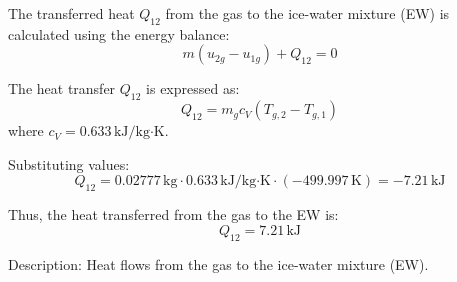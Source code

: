 The transferred heat \( Q_{12} \) from the gas to the ice-water mixture (EW) is calculated using the energy balance:  
\[
m \left( u_{2g} - u_{1g} \right) + Q_{12} = 0
\]  

The heat transfer \( Q_{12} \) is expressed as:  
\[
Q_{12} = m_g c_V \left( T_{g,2} - T_{g,1} \right)
\]  
where \( c_V = 0.633 \, \text{kJ/kg·K} \).  

Substituting values:  
\[
Q_{12} = 0.02777 \, \text{kg} \cdot 0.633 \, \text{kJ/kg·K} \cdot \left( -499.997 \, \text{K} \right) = -7.21 \, \text{kJ}
\]  

Thus, the heat transferred from the gas to the EW is:  
\[
Q_{12} = 7.21 \, \text{kJ}
\]  

Description: Heat flows from the gas to the ice-water mixture (EW).